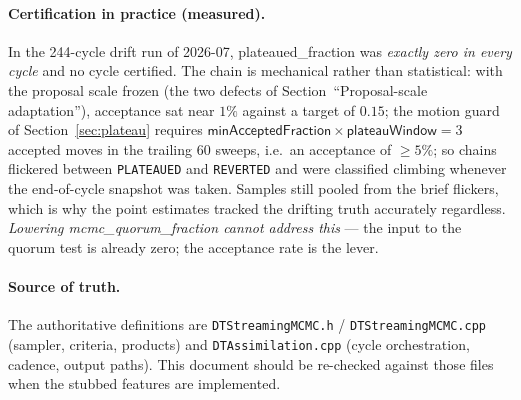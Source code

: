 \documentclass[11pt]{article}
\newcommand{\code}[1]{\texttt{\small #1}}
\newcommand{\param}[1]{\textsf{#1}}
\begin{document}
\paragraph{Certification in practice (measured).} In the 244-cycle drift
run of 2026-07, \param{plateaued\_fraction} was \emph{exactly zero in every
cycle} and no cycle certified. The chain is mechanical rather than
statistical: with the proposal scale frozen (the two defects of
Section~``Proposal-scale adaptation''), acceptance sat near $1\%$ against a
target of $0.15$; the motion guard of Section~\ref{sec:plateau} requires
$\param{minAcceptedFraction}\times\param{plateauWindow} = 3$ accepted moves
in the trailing $60$ sweeps, i.e.\ an acceptance of $\ge 5\%$; so chains
flickered between \code{PLATEAUED} and \code{REVERTED} and were classified
climbing whenever the end-of-cycle snapshot was taken. Samples still pooled
from the brief flickers, which is why the point estimates tracked the
drifting truth accurately regardless. \emph{Lowering
\param{mcmc\_quorum\_fraction} cannot address this} --- the input to the
quorum test is already zero; the acceptance rate is the lever.

\paragraph{Source of truth.} The authoritative definitions are
\code{DTStreamingMCMC.h} / \code{DTStreamingMCMC.cpp} (sampler, criteria,
products) and \code{DTAssimilation.cpp} (cycle orchestration, cadence,
output paths). This document should be re-checked against those files when
the stubbed features are implemented.
\end{document}
